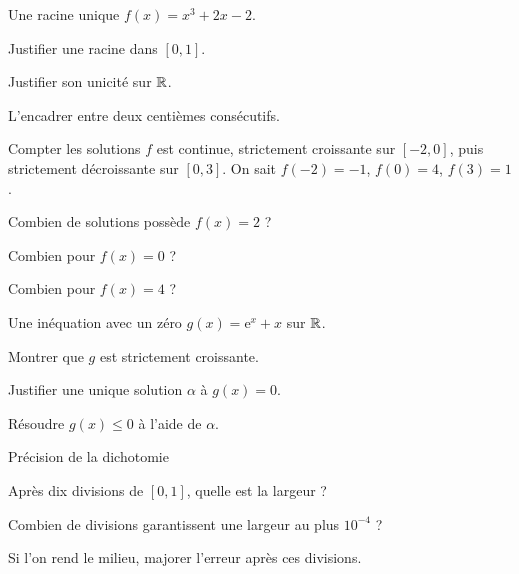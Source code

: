 \begingroup\renewcommand{\otBesoinPlace}[1]{}\begin{minipage}{\linewidth}
\begin{exercice}[2]{Une racine unique}
$f(x)=x^3+2x-2$.
\begin{questions}
\item Justifier une racine dans $[0,1]$.
\item Justifier son unicité sur $\mathbb{R}$.
\item L’encadrer entre deux centièmes consécutifs.
\end{questions}
\end{exercice}
\begin{exercice}[2]{Compter les solutions}
$f$ est continue, strictement croissante sur $[-2,0]$, puis strictement décroissante sur $[0,3]$. On sait $f(-2)=-1$, $f(0)=4$, $f(3)=1$.
\begin{questions}
\item Combien de solutions possède $f(x)=2$ ?
\item Combien pour $f(x)=0$ ?
\item Combien pour $f(x)=4$ ?
\end{questions}
\end{exercice}
\begin{exercice}[2]{Une inéquation avec un zéro}
$g(x)=\mathrm e^x+x$ sur $\mathbb{R}$.
\begin{questions}
\item Montrer que $g$ est strictement croissante.
\item Justifier une unique solution $\alpha$ à $g(x)=0$.
\item Résoudre $g(x)\leq0$ à l’aide de $\alpha$.
\end{questions}
\end{exercice}
\begin{exercice}[2]{Précision de la dichotomie}

\begin{questions}
\item Après dix divisions de $[0,1]$, quelle est la largeur ?
\item Combien de divisions garantissent une largeur au plus $10^{-4}$ ?
\item Si l’on rend le milieu, majorer l’erreur après ces divisions.
\end{questions}
\end{exercice}
\end{minipage}\endgroup
\clearpage
{}
